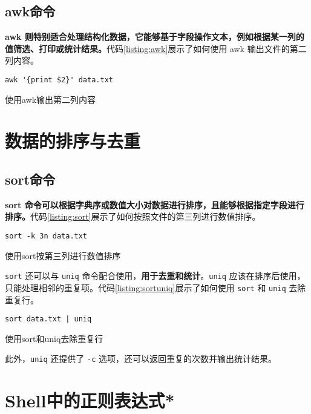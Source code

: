\subsection{awk命令}

\textbf{awk 则特别适合处理结构化数据，它能够基于字段操作文本，例如根据某一列的值筛选、打印或统计结果。}代码\ref{listing:awk}展示了如何使用 awk 输出文件的第二列内容。

\begin{longlisting}
    \begin{verbatim}
awk '{print $2}' data.txt
    \end{verbatim}
    \caption{使用awk输出第二列内容}
    \label{listing:awk}
\end{longlisting}

\section{数据的排序与去重}

\subsection{sort命令}

\textbf{sort 命令可以根据字典序或数值大小对数据进行排序，且能够根据指定字段进行排序。}代码\ref{listing:sort}展示了如何按照文件的第三列进行数值排序。

\begin{longlisting}
    \begin{verbatim}
sort -k 3n data.txt
    \end{verbatim}
    \caption{使用sort按第三列进行数值排序}
    \label{listing:sort}
\end{longlisting}

\texttt{sort} 还可以与 \texttt{uniq} 命令配合使用，\textbf{用于去重和统计}。\texttt{uniq} 应该在排序后使用，只能处理相邻的重复项。代码\ref{listing:sortuniq}展示了如何使用 \texttt{sort} 和 \texttt{uniq} 去除重复行。

\begin{longlisting}
    \begin{verbatim}
sort data.txt | uniq
    \end{verbatim}
    \caption{使用sort和uniq去除重复行}
    \label{listing:sortuniq}
\end{longlisting}

此外，\texttt{uniq} 还提供了 \texttt{-c} 选项，还可以返回重复的次数并输出统计结果。

\section{Shell中的正则表达式*}

